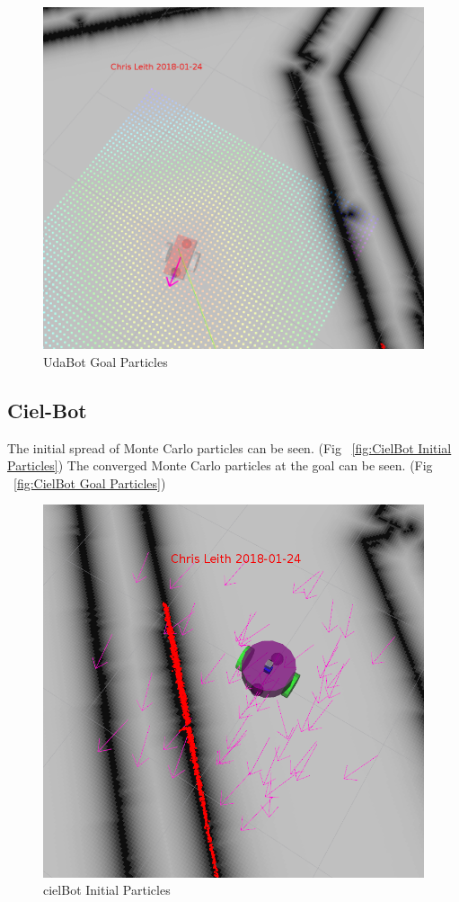 \documentclass[10pt,journal,compsoc]{IEEEtran}
\begin{document}
\begin{figure}[h]
      \centering
      \includegraphics[width=\linewidth]{../Assets/writeupImages/udaBot_rvizGoal.png}
      \caption{UdaBot Goal Particles }
      \label{fig:UdaBot Goal Particles}
\end{figure}

\subsection{Ciel-Bot}
The initial spread of Monte Carlo particles can be seen. (Fig ~\ref{fig:CielBot Initial Particles})
The converged Monte Carlo particles at the goal can be seen. (Fig ~\ref{fig:CielBot Goal Particles})

\begin{figure}[h]
      \centering
      \includegraphics[width=\linewidth]{../Assets/writeupImages/cielBot_rvizInit.png}
      \caption{cielBot Initial Particles }
      \label{fig:cielBot Initial Particles}
\end{figure}
\end{document}
